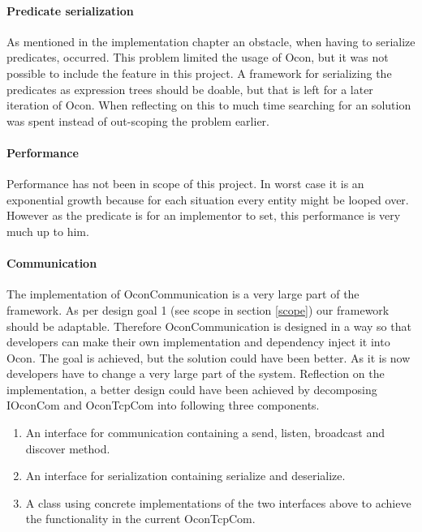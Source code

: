 \documentclass[../report.tex]{subfiles}
\begin{document}
\graphicspath{{img/}{../img/}}



\paragraph{Predicate serialization}
As mentioned in the implementation chapter an obstacle, when having to serialize predicates, occurred. This problem limited the usage of Ocon, but it was not possible to include the feature in this project. A framework for serializing the predicates as expression trees should be doable, but that is left for a later iteration of Ocon. When reflecting on this to much time searching for an solution was spent instead of out-scoping the problem earlier. 


\paragraph{Performance}
Performance has not been in scope of this project. In worst case it is an exponential growth because for each situation every entity might be looped over. However as the predicate is for an implementor to set, this performance is very much up to him.

\paragraph{Communication}
The implementation of OconCommunication is a very large part of the framework. As per design goal 1 (see scope in section \ref{scope}) our framework should be adaptable. Therefore OconCommunication is designed in a way so that developers can make their own implementation and dependency inject it into Ocon. The goal is achieved, but the solution could have been better. As it is now developers have to change a very large part of the system. Reflection on the implementation, a better design could have been achieved by decomposing IOconCom and OconTcpCom into following three components.

\begin{enumerate}
\item An interface for communication containing a send, listen, broadcast and discover method.
\item An interface for serialization containing serialize and deserialize.
\item A class using concrete implementations of the two interfaces above to achieve the functionality in the current OconTcpCom.
\end{enumerate}
\end{document}
